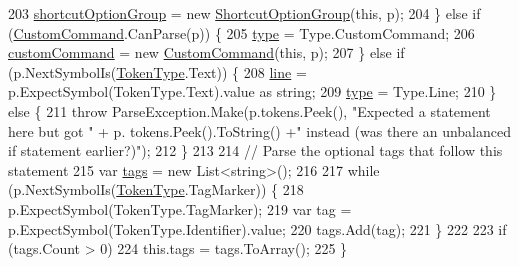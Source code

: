 \begin{DoxyCode}
203                     \hyperlink{a00166_a54d73ad69c4af4a0d61edeaea4c8ca4f}{shortcutOptionGroup} = \textcolor{keyword}{new} 
      \hyperlink{a00166_a518000e4e6219ce5f9f4229f505cd944ae8a0b2e51320b69d57d378776ee0647a}{ShortcutOptionGroup}(\textcolor{keyword}{this}, p);
204                 \} \textcolor{keywordflow}{else} \textcolor{keywordflow}{if} (\hyperlink{a00166_a518000e4e6219ce5f9f4229f505cd944af6b081742758e5cbc3a2e679e521a4fe}{CustomCommand}.CanParse(p)) \{
205                     \hyperlink{a00166_aa3fa0eb260e412720562ce06b7dc06fe}{type} = Type.CustomCommand;
206                     \hyperlink{a00166_a8a98e7d4c66f9909da865f0e671d69f2}{customCommand} = \textcolor{keyword}{new} \hyperlink{a00166_a518000e4e6219ce5f9f4229f505cd944af6b081742758e5cbc3a2e679e521a4fe}{CustomCommand}(\textcolor{keyword}{this}, p);
207                 \} \textcolor{keywordflow}{else} \textcolor{keywordflow}{if} (p.NextSymbolIs(\hyperlink{a00051_a301aa7c866593a5b625a8fc158bbeace}{TokenType}.Text)) \{
208                     \hyperlink{a00166_a37695c7b00776bb292fd64894a70fb72}{line} = p.ExpectSymbol(TokenType.Text).value as \textcolor{keywordtype}{string};
209                     \hyperlink{a00166_aa3fa0eb260e412720562ce06b7dc06fe}{type} = Type.Line;
210                 \} \textcolor{keywordflow}{else} \{
211                     \textcolor{keywordflow}{throw} ParseException.Make(p.tokens.Peek(), \textcolor{stringliteral}{"Expected a statement here but got "} + p.
      tokens.Peek().ToString() +\textcolor{stringliteral}{" instead (was there an unbalanced if statement earlier?)"});
212                 \}
213 
214                 \textcolor{comment}{// Parse the optional tags that follow this statement}
215                 var \hyperlink{a00148_a58b3a15788fd2d4127d73619dc6d04ae}{tags} = \textcolor{keyword}{new} List<string>();
216 
217                 \textcolor{keywordflow}{while} (p.NextSymbolIs(\hyperlink{a00051_a301aa7c866593a5b625a8fc158bbeace}{TokenType}.TagMarker)) \{
218                     p.ExpectSymbol(TokenType.TagMarker);
219                     var tag = p.ExpectSymbol(TokenType.Identifier).value;
220                     tags.Add(tag);
221                 \}
222 
223                 \textcolor{keywordflow}{if} (tags.Count > 0)
224                     this.tags = tags.ToArray();
225             \}
\end{DoxyCode}


